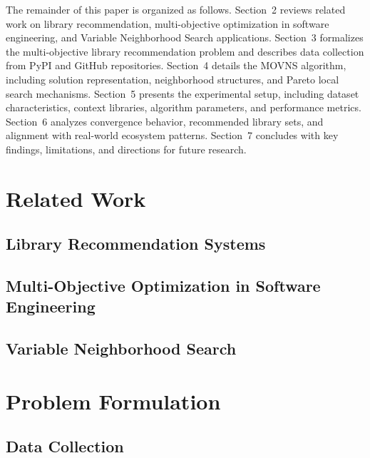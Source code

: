 \documentclass[runningheads]{llncs}
\begin{document}
The remainder of this paper is organized as follows. Section~2 reviews related work on library recommendation, multi-objective optimization in software engineering, and Variable Neighborhood Search applications. Section~3 formalizes the multi-objective library recommendation problem and describes data collection from PyPI and GitHub repositories. Section~4 details the MOVNS algorithm, including solution representation, neighborhood structures, and Pareto local search mechanisms. Section~5 presents the experimental setup, including dataset characteristics, context libraries, algorithm parameters, and performance metrics. Section~6 analyzes convergence behavior, recommended library sets, and alignment with real-world ecosystem patterns. Section~7 concludes with key findings, limitations, and directions for future research.

\section{Related Work}

\subsection{Library Recommendation Systems}


\subsection{Multi-Objective Optimization in Software Engineering}


\subsection{Variable Neighborhood Search}


\section{Problem Formulation}

\subsection{Data Collection}

\end{document}
